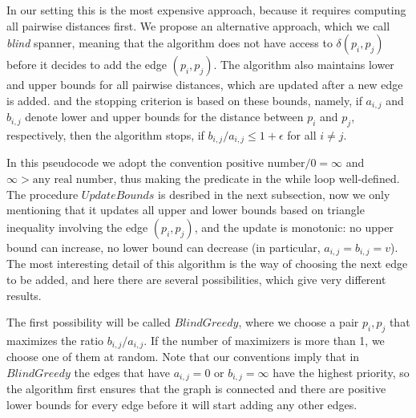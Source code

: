 \documentclass[10pt]{article}
\newcommand{\eps}{\epsilon}
\newcommand{\dist}{\delta}
\begin{document}
 In our setting this is the most expensive approach, because it requires
 computing all pairwise distances first. We propose an alternative approach, which we call
 \textit{blind} spanner, meaning that the algorithm does not have access to $\dist(p_i, p_j)$
 before it decides to add the edge $(p_i, p_j)$. 
 The algorithm also maintains lower and upper bounds
 for all pairwise distances, which are updated after a new edge is added. and the stopping criterion
 is based on these bounds, namely, if $a_{i, j}$ and $b_{i,j}$ denote lower and upper bounds
 for the distance between $p_i$ and $p_j$, respectively, then the algorithm stops, if $b_{i,j} / a_{i, j} \leq 1 + \eps$
 for all $i \neq j$.

\begin{algorithmic}
\label{alg:blind_spanner}
\Function{BlindSpanner}{$P, \eps$}
    \While {$\exists i \neq j : b_{i,j} / a_{i,j} > 1 + \eps$}
    \State {$v \gets \dist(p_i, pj)$}
    \EndWhile
\EndFunction
\end{algorithmic}


In this pseudocode we adopt the convention $ \textrm{positive number} / 0 = \infty$ and $\infty > \textrm{any real number}$,
thus making the predicate in the while loop well-defined.  The procedure $UpdateBounds$ is desribed in the next subsection, 
now we only mentioning that it updates all upper and lower bounds based on triangle inequality involving the edge $(p_i, p_j)$,
and the update is monotonic: no upper bound can increase, no lower bound can decrease (in particular, $a_{i,j} = b_{i,j} = v$).
The most interesting detail of this algorithm is the way of choosing the next edge to be added, and here 
there are several possibilities, which give very different results.

The first possibility will be called $BlindGreedy$, where we choose a pair $p_i, p_j$ that maximizes
the ratio $b_{i,j} / a_{i,j}$. If the number of maximizers is more than 1, we choose one of them at random.
Note that our conventions imply that in $BlindGreedy$ the edges that have $a_{i,j} = 0$ or $b_{i,j} = \infty$
have the highest priority, so the algorithm first ensures that the graph is connected and there are positive
lower bounds for every edge before it will start adding any other edges.
\end{document}
